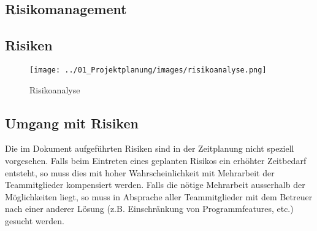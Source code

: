 \begin{landscape}
\section{Risikomanagement}
\subsection{Risiken}
\begin{figure}[H]
\centering
\texttt{[image: ../01\_Projektplanung/images/risikoanalyse.png]}
\caption{Risikoanalyse}
\end{figure}
\end{landscape}
\subsection{Umgang mit Risiken}
Die im Dokument aufgeführten Risiken sind in der Zeitplanung nicht speziell vorgesehen. Falls beim Eintreten eines geplanten Risikos ein erhöhter Zeitbedarf entsteht, so muss dies mit hoher Wahrscheinlichkeit mit Mehrarbeit der Teammitglieder kompensiert werden. Falls die nötige Mehrarbeit ausserhalb der Möglichkeiten liegt, so muss in Absprache aller Teammitglieder mit dem Betreuer nach einer anderer Lösung (z.B. Einschränkung von Programmfeatures, etc.) gesucht werden.